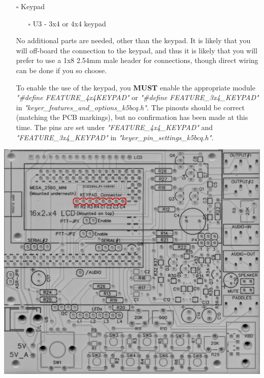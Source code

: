\documentclass[11pt]{article}
\begin{document}
\newpage
\begin{itemize}
\item[{$\square$}] Keypad
\begin{itemize}
\item[{$\square$}] U3 - 3x4 or 4x4 keypad
\end{itemize}

No additional parts are needed, other than the keypad.  It is likely that you will off-board the connection to the keypad, and thus it is likely that you will prefer to use a 1x8 2.54mm male header for connections, though direct wiring can be done if you so choose.

To enable the use of the keypad, you \textbf{MUST} enable the appropriate module \emph{"\#define FEATURE\_4x4KEYPAD"} or \emph{"\#define FEATURE\_3x4\_KEYPAD"} in \emph{"keyer\_features\_and\_options\_k5bcq.h".}  The pinouts should be correct (matching the PCB markings), but no confirmation has been made at this time.  The pins are set under \emph{"FEATURE\_4x4\_KEYPAD"} and \emph{"FEATURE\_3x4\_KEYPAD"} in \emph{"keyer\_pin\_settings\_k5bcq.h".}
\end{itemize}
\begin{center}
\includegraphics[width=.9\linewidth]{../png/3.2/pcb-top-3x4-keypad.png}
\end{center}
\end{document}
